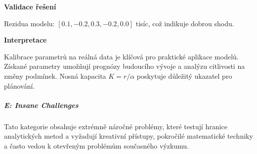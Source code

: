 \begin{example}
\vspace{1.5\baselineskip}

\noindent\textbf{Validace řešení}

Rezidua modelu: $[0.1, -0.2, 0.3, -0.2, 0.0]$ tisíc, což indikuje dobrou shodu.

\vspace{1.5\baselineskip}

\noindent\textbf{Interpretace}

Kalibrace parametrů na reálná data je klíčová pro praktické aplikace modelů. 
Získané parametry umožňují prognózy budoucího vývoje a analýzu citlivosti 
na změny podmínek. Nosná kapacita $K = r/\alpha$ poskytuje důležitý ukazatel 
pro plánování.

\end{example}

\subparagraph*{E: Insane Challenges}
\label{subpar:e-insane-challenges}

Tato kategorie obsahuje extrémně náročné problémy, které testují hranice analytických 
metod a vyžadují kreativní přístupy, pokročilé matematické techniky a často vedou 
k otevřeným problémům současného výzkumu.

\vspace{1\baselineskip}

